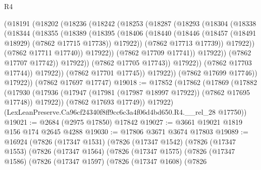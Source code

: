 \begin{lexlean}{R4}
\begin{coremodule}
                        (@18191
                          (@18202
                            (@18236
                              (@18242
                                (@18253
                                  (@18287
                                    (@18293
                                      (@18304
                                        (@18338
                                          (@18344
                                            (@18355
                                              (@18389
                                                (@18395
                                                  (@18406
                                                    (@18440
                                                      (@18446
                                                        (@18457
                                                          (@18491 @18929)
                                                          (@7862 @17715 @17738))
                                                        @17922))
                                                    (@7862 @17713 @17739))
                                                  @17922))
                                              (@7862 @17711 @17740))
                                            @17922))
                                        (@7862 @17709 @17741))
                                      @17922))
                                  (@7862 @17707 @17742))
                                @17922))
                            (@7862 @17705 @17743))
                          @17922))
                      (@7862 @17703 @17744))
                    @17922))
                (@7862 @17701 @17745))
              @17922))
          (@7862 @17699 @17746))
        @17922))
    (@7862 @17697 @17747)
@19018 := @17852
    (@17862
      (@17869
        (@17882
          (@17930 (@17936 (@17947 (@17981 (@17987 @18997 @17922)) (@7862 @17695 @17748)) @17922))
          (@7862 @17693 @17749))
        @17922)
      (LexLeanPreserve.Ca96cf24340f8ff9cc6c3a4f06d4bd650.R4.__rel_28 @17750))
@19021 := @2684 (@2975 @17850) @17842
@19027 := @3661 @19021 @1819 @156 @174 @2645 @4288
@19030 := @17806 @3671 @3674 @17803
@19089 := @16924
    (@7826
      (@17347 @1531)
      (@7826
        (@17347 @1542)
        (@7826
          (@17347 @1553)
          (@7826
            (@17347 @1564)
            (@7826
              (@17347 @1575)
              (@7826
                (@17347 @1586)
                (@7826
                  (@17347 @1597)
                  (@7826
                    (@17347 @1608)
                    (@7826

\end{coremodule}
\end{lexlean}
